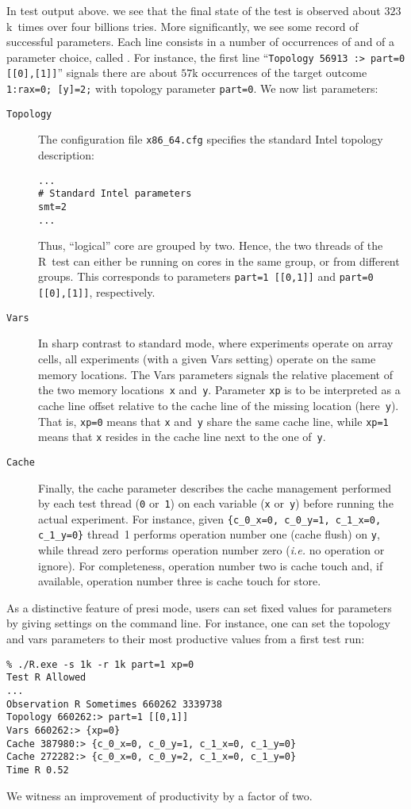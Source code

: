In test output above. we see that the final state of the test is
observed about $323$k~times over four billions tries. More
significantly, we see some record of successful parameters. Each line
consists in a number of occurrences of and of a parameter choice,
called . For instance,
the first line ``\texttt{Topology 56913 :> part=0 [[0],[1]]}'' signals
there are about $57$k occurrences of the target
outcome \texttt{1:rax=0; [y]=2;} with topology
parameter \texttt{part=0}. We now list parameters:
\begin{description}
\item[{\tt Topology}]  The configuration file \texttt{x86\_64.cfg}
specifies the standard Intel topology description:
\begin{verbatim}
...
# Standard Intel parameters
smt=2
...
\end{verbatim}
Thus, ``logical'' core are grouped by two. Hence, the two threads of
the R~test can either be running on cores in the same group, or from
different groups. This corresponds to parameters \texttt{part=1
[[0,1]]} and \texttt{part=0 [[0],[1]]}, respectively.
\item[{\tt Vars}] In sharp contrast to standard mode, where
experiments operate on array cells,  all experiments (with a given
Vars setting) operate on the same memory locations. The Vars
parameters signals the relative placement of the two memory
locations~\texttt{x} and~\texttt{y}. Parameter \texttt{xp} is to be
interpreted as a cache line offset relative to the cache line of the
missing location (here~\texttt{y}). That is, \texttt{xp=0} means
that \texttt{x} and~\texttt{y} share the same cache line,
while \texttt{xp=1} means that \texttt{x} resides in the cache line
next to the one of~\texttt{y}.
\item[{\tt Cache}] Finally, the cache  parameter describes the cache
management performed by each test thread (\texttt{0} or~\texttt{1}) on
each variable (\texttt{x} or~\texttt{y}) before running the actual
experiment. For instance, given \texttt{\{c\_0\_x=0, c\_0\_y=1,
c\_1\_x=0, c\_1\_y=0\}} thread~1 performs operation number one (cache
flush) on \texttt{y}, while thread zero performs operation number zero
(\emph{i.e.} no operation or ignore). For completeness, operation
number two is cache touch and, if available, operation number three is
cache touch for store.
\end{description}

As a distinctive feature of presi mode, users can set fixed values for
parameters by giving settings on the command line. For instance, one
can set the topology and vars parameters to their most productive
values from a first test run:
\begin{verbatim}
% ./R.exe -s 1k -r 1k part=1 xp=0
Test R Allowed
...
Observation R Sometimes 660262 3339738
Topology 660262:> part=1 [[0,1]]
Vars 660262:> {xp=0}
Cache 387980:> {c_0_x=0, c_0_y=1, c_1_x=0, c_1_y=0}
Cache 272282:> {c_0_x=0, c_0_y=2, c_1_x=0, c_1_y=0}
Time R 0.52
\end{verbatim}
We witness an improvement of productivity by a factor of two.

